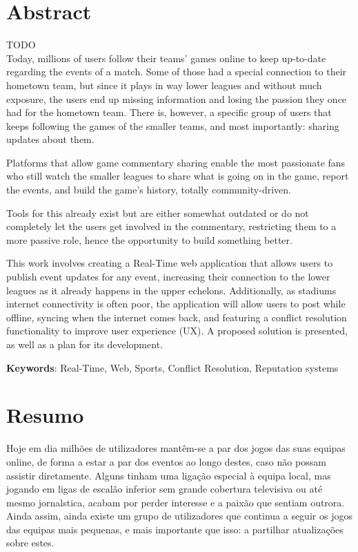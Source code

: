 \chapter*{Abstract}

{\Huge TODO} \\
Today, millions of users follow their teams' games online to keep up-to-date regarding the events of a match. Some of those had a special connection to their hometown team, but since it plays in way lower leagues and without much exposure,  the users end up missing information and losing the passion they once had for the hometown team. There is, however,  a specific group of users that keeps following the games of the smaller teams, and most importantly: sharing updates about them. 

Platforms that allow game commentary sharing enable the most passionate fans who still watch the smaller leagues to share what is going on in the game, report the events, and build the game's history, totally community-driven. 

Tools for this already exist but are either somewhat outdated or do not completely let the users get involved in the commentary, restricting them to a more passive role, hence the opportunity to build something better. 

This work involves creating a Real-Time web application that allows users to publish event updates for any event, increasing their connection to the lower leagues as it already happens in the upper echelons. Additionally, as stadiums internet connectivity is often poor, the application will allow users to post while offline, syncing when the internet comes back, and featuring a conflict resolution functionality to improve user experience (UX). A proposed solution is presented, as well as a plan for its development.


\vspace*{10mm}\noindent
\textbf{Keywords}: Real-Time, Web, Sports, Conflict Resolution, Reputation systems

\chapter*{Resumo}

Hoje em dia milhões de utilizadores mantêm-se a par dos jogos das suas equipas online, de forma a estar a par dos eventos ao longo destes, caso não possam assistir diretamente. Alguns tinham uma ligação especial à equipa local, mas jogando em ligas de escalão inferior sem grande cobertura televisiva ou até mesmo jornalstica, acabam por perder interesse e a paixão que sentiam outrora. Ainda assim, ainda existe um grupo de utilizadores que continua a seguir os jogos das equipas mais pequenas, e mais importante que isso: a partilhar atualizações sobre estes. 

